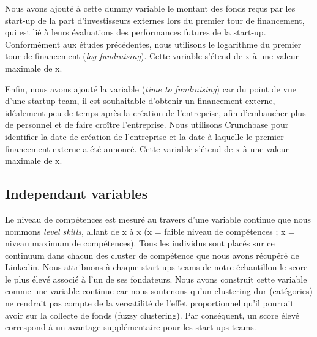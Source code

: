\documentclass[12pt]{article}
\begin{document}
Nous avons ajouté à cette dummy variable le montant des fonds reçus par les start-up de la part d'investisseurs externes lors du premier tour de financement, qui est lié à leurs évaluations des performances futures de la start-up. Conformément aux études précédentes, nous utilisons le logarithme du premier tour de financement (\textit{log fundraising}). Cette variable s'étend de x à une valeur maximale de x.

Enfin, nous avons ajouté la variable (\textit{time to fundraising}) car du point de vue d'une startup team, il est souhaitable d'obtenir un financement externe, idéalement peu de temps après la création de l'entreprise, afin d'embaucher plus de personnel et de faire croître l'entreprise. Nous utilisons Crunchbase pour identifier la date de création de l'entreprise et la date à laquelle le premier financement externe a été annoncé. Cette variable s'étend de x à une valeur maximale de x.

\subsection{Independant variables}

Le niveau de compétences est mesuré au travers d'une variable continue que nous nommons \textit{level skills}, allant de x à x (x = faible niveau de compétences ; x = niveau maximum de compétences). Tous les individus sont placés sur ce continuum dans chacun des cluster de compétence que nous avons récupéré de Linkedin. Nous attribuons à chaque start-ups teams de notre échantillon le score le plus élevé associé à l'un de ses fondateurs. Nous avons construit cette variable comme une variable continue car nous soutenons qu'un clustering dur (catégories) ne rendrait pas compte de la versatilité de l'effet proportionnel qu'il pourrait avoir sur la collecte de fonds (fuzzy clustering). Par conséquent, un score élevé correspond à un avantage supplémentaire pour les start-ups teams.
\end{document}
